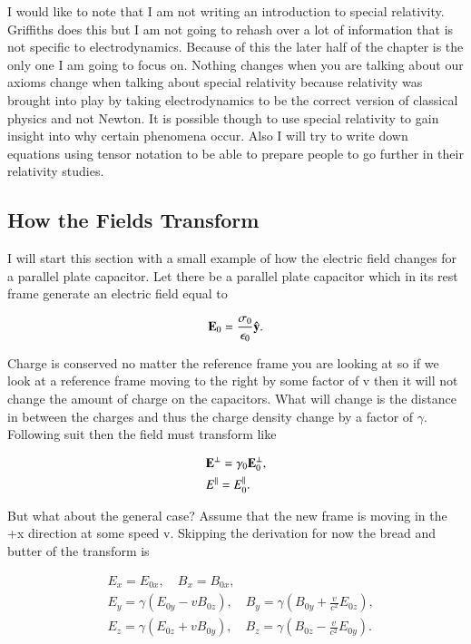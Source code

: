 \documentclass[preprint, review,12pt]{elsarticle}
\def\b{\textbf}
\def\9{\left(}
\def\0{\right)}
\newcommand{\hb}[1]{\hat{\b #1}}
\begin{document}
I would like to note that I am not writing an introduction to special relativity. Griffiths does this but I am not going to rehash over a lot of information that is not specific to electrodynamics. Because of this the later half of the chapter is the only one I am going to focus on. Nothing changes when you are talking about our axioms change when talking about special relativity because relativity was brought into play by taking electrodynamics to be the correct version of classical physics and not Newton. It is possible though to use special relativity to gain insight into why certain phenomena occur. Also I will try to write down equations using tensor notation to be able to prepare people to go further in their relativity studies.


\subsection{How the Fields Transform}

I will start this section with a small example of how the electric field changes for a parallel plate capacitor. Let there be a parallel plate capacitor which in its rest frame generate an electric field equal to 

\begin{equation}
    \b E_0 = \frac{\sigma_0}{\epsilon_0}\hb{y}.
\end{equation}

Charge is conserved no matter the reference frame you are looking at so if we look at a reference frame moving to the right by some factor of v then it will not change the amount of charge on the capacitors. What will change is the distance in between the charges and thus the charge density change by a factor of $\gamma$. Following suit then the field must transform like

\begin{equation}
\begin{split}
    & \b E^\bot = \gamma_0 \b E_0^\bot, \\
    & E^\parallel = E_0^\parallel. 
\end{split}
\end{equation}

But what about the general case? Assume that the new frame is moving in the +x direction at some speed v. Skipping the derivation for now the bread and butter of the transform is

\begin{equation}
\begin{split}
    & E_x = E_{0x}, \quad B_x = B_{0x}, \\
    & E_y = \gamma(E_{0y} - v B_{0z}), \quad B_y = \gamma \9 B_{0y} + \frac{v}{c^2} E_{0z} \0, \\
    & E_z = \gamma(E_{0z} + v B_{0y}), \quad B_z = \gamma \9 B_{0z} - \frac{v}{c^2}E_{0y} \0.
\end{split}
\end{equation}
\end{document}
